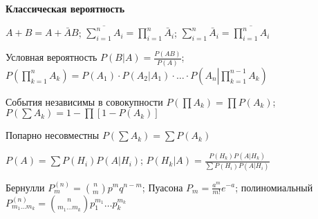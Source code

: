 \begin{center}
    \textbf{Классическая вероятность}
\end{center}

$A + B = A + \bar{A}B$;
$\displaystyle \overline{\sum_{i=1}^{n}A_i} = \prod_{i=1}^{n}\bar{A}_i$;
$\displaystyle \sum_{i=1}^{n}\bar{A}_i = \overline{\prod_{i=1}^{n}A_i}$

Условная вероятность
$\displaystyle P(B|A) = \frac{P(AB)}{P(A)}$;
$\displaystyle P\left(\prod_{k=1}^{n}A_k\right) = P(A_1)\cdot P(A_2|A_1)\cdot\ldots\cdot P\left(A_n\left|\right.\prod_{k=1}^{n-1}A_k\right)$

События независимы в совокупности
$P(\prod A_k) = \prod{P(A_k)}$;
$P(\sum{A_k}) = 1-\prod[1-P(A_k)]$

Попарно несовместны $P(\sum{A_k}) = \sum{P(A_k)}$

$P(A) = \sum P(H_i)P(A|H_i)$;
$\displaystyle P(H_k|A) = \frac{P(H_k)P(A|H_k)}{\sum P(H_i)P(A|H_i)}$

Бернулли
$P^{(n)}_m = \binom{n}{m}p^mq^{n-m}$;
Пуасона
$\displaystyle P_m = \frac{a^m}{m!}e^{-a}$;
полиномиальный
$P^{(n)}_{m_1\ldots m_k} = \binom{n}{m_1\ldots m_k}p_1^{m_1}\ldots p_k^{m_k}$
